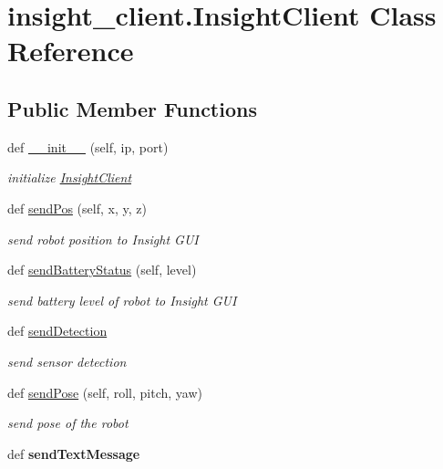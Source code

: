\hypertarget{classinsight__client_1_1InsightClient}{}\section{insight\+\_\+client.\+Insight\+Client Class Reference}
\label{classinsight__client_1_1InsightClient}
\subsection*{Public Member Functions}
\begin{DoxyCompactItemize}
\item 
def \hyperlink{classinsight__client_1_1InsightClient_a6ce2fb5655f85532583d4984f2c6f3da}{\+\_\+\+\_\+init\+\_\+\+\_\+} (self, ip, port)
\begin{DoxyCompactList}\small\item\em initialize \hyperlink{classinsight__client_1_1InsightClient}{Insight\+Client} \end{DoxyCompactList}\item 
def \hyperlink{classinsight__client_1_1InsightClient_a341da3412de138de10607a93656c4e49}{send\+Pos} (self, x, y, z)
\begin{DoxyCompactList}\small\item\em send robot position to Insight G\+U\+I \end{DoxyCompactList}\item 
def \hyperlink{classinsight__client_1_1InsightClient_a9b03273a011db2d6c88be123206fe975}{send\+Battery\+Status} (self, level)
\begin{DoxyCompactList}\small\item\em send battery level of robot to Insight G\+U\+I \end{DoxyCompactList}\item 
def \hyperlink{classinsight__client_1_1InsightClient_a1687ed68fdf32c05c179a5226df7a8b4}{send\+Detection}
\begin{DoxyCompactList}\small\item\em send sensor detection \end{DoxyCompactList}\item 
def \hyperlink{classinsight__client_1_1InsightClient_aa4784fd79c440fc87674dc1e1c76bb35}{send\+Pose} (self, roll, pitch, yaw)
\begin{DoxyCompactList}\small\item\em send pose of the robot \end{DoxyCompactList}\item 
\hypertarget{classinsight__client_1_1InsightClient_a190f2cba379bef06c42094278ed13107}{}def {\bfseries send\+Text\+Message}\label{classinsight__client_1_1InsightClient_a190f2cba379bef06c42094278ed13107}


\end{DoxyCompactItemize}
